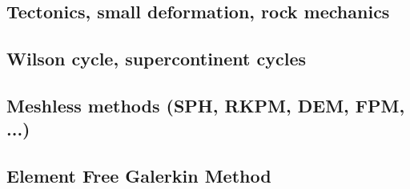 \cite{kerh14}

\subsection*{Tectonics, small deformation, rock mechanics}

\noindent
\cite{ilma93}
\cite{hept96}
\cite{esfm08}
\cite{lega12}

\subsection*{Wilson cycle, supercontinent cycles}

\noindent
\cite{trry95}
\cite{evan03}
\cite{zhzl07}\cite{copb07}
\cite{zhzm09}\cite{onlj09}
\cite{lemj11}
\cite{buto14}\cite{helo14}\cite{roct14}
\cite{begb19}\cite{wihb19}

\subsection*{Meshless methods (SPH, RKPM, DEM, FPM, ...)}
 
 


\noindent
\cite{lucy77}
\cite{beko96}
\cite{mofz97}
\cite{begl00}
\cite{lilr02}
\cite{lill03}
\cite{wali04}
\cite{febh05}\cite{lixl05}
\cite{dacl10}
\cite{prcl11}\cite{kukg11}
\cite{koau13}\cite{viau13}
\cite{dazs14}
\cite{nifs15}
\cite{krrk18}

\subsection*{Element Free Galerkin Method}
 

\noindent
\cite{begl94b}
\cite{belg95a}
\cite{belg95b}
\cite{bekf96}\cite{como96}
\cite{bekk97}
\cite{pobe98}

